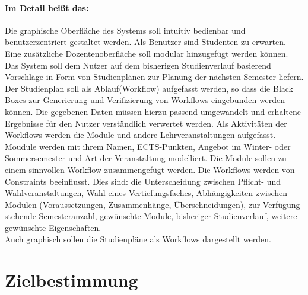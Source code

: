 \documentclass[titlepage=true, parskip=full]{scrartcl}
\begin{document}
\paragraph{Im Detail heißt das:}
Die graphische Oberfläche des Systems soll intuitiv bedienbar und benutzerzentriert gestaltet werden. Als Benutzer sind Studenten zu erwarten. Eine zusätzliche Dozentenoberfläche soll modular hinzugefügt werden können. Das System soll dem Nutzer auf dem bisherigen Studienverlauf basierend Vorschläge in Form von Studienplänen zur Planung der nächsten Semester liefern. Der Studienplan soll als Ablauf(Workflow) aufgefasst werden, so dass die Black Boxes zur Generierung und Verifizierung von Workflows eingebunden werden können. Die gegebenen Daten müssen hierzu passend umgewandelt und erhaltene Ergebnisse für den Nutzer verständlich verwertet werden. Als Aktivitäten der Workflows werden die Module und andere Lehrveranstaltungen aufgefasst. Moudule werden mit ihrem Namen, ECTS-Punkten, Angebot im Winter- oder Sommersemester und Art der Veranstaltung modelliert. Die Module sollen zu einem sinnvollen Workflow zusammengefügt werden. Die Workflows werden von Constraints beeinflusst. Dies sind: die Unterscheidung zwischen Pflicht- und Wahlveranstaltungen, Wahl eines Vertiefungsfaches, Abhängigkeiten zwischen Modulen (Voraussetzungen, Zusammenhänge, Überschneidungen), zur Verfügung stehende Semesteranzahl, gewünschte Module, bisheriger Studienverlauf, weitere gewünschte Eigenschaften.\\
Auch graphisch sollen die Studienpläne als Workflows dargestellt werden. 
\section{Zielbestimmung}
\end{document}
